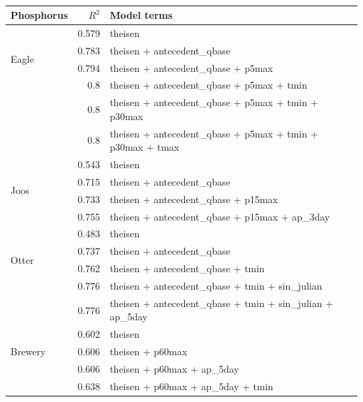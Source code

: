 \documentclass[12pt]{article}
\begin{document}
\begin{table}[h]
\begin{center}
\begin{tabular}{lrl}
    \textbf{Phosphorus} & $R^2$ & Model terms \\
    \hline
    \multirow{4}{*}{Eagle} & 0.579 & theisen\\
    & 0.783 & theisen + antecedent\_qbase\\
    & 0.794 & theisen + antecedent\_qbase + p5max\\
    & 0.8 & theisen + antecedent\_qbase + p5max + tmin \\
    & 0.8 & theisen + antecedent\_qbase + p5max + tmin + p30max\\
    & 0.8 & theisen + antecedent\_qbase + p5max + tmin + p30max + tmax
    \vspace{2mm}\\
    \multirow{4}{*}{Joos} & 0.543 & theisen\\
    & 0.715 & theisen + antecedent\_qbase\\
    & 0.733 & theisen + antecedent\_qbase + p15max\\
    & 0.755 & theisen + antecedent\_qbase + p15max + ap\_3day
    \vspace{2mm}\\
    \multirow{4}{*}{Otter} & 0.483 & theisen\\
    & 0.737 & theisen + antecedent\_qbase\\
    & 0.762 & theisen + antecedent\_qbase + tmin\\
    & 0.776 & theisen + antecedent\_qbase + tmin + sin\_julian\\
    & 0.776 & theisen + antecedent\_qbase + tmin + sin\_julian + ap\_5day
    \vspace{2mm}\\
    \multirow{3}{*}{Brewery} & 0.602 & theisen\\
    & 0.606 & theisen + p60max\\
    & 0.606 & theisen + p60max + ap\_5day\\
    & 0.638 & theisen + p60max + ap\_5day + tmin\\

    \end{tabular}
    \caption{\label{r_square_nosnow}}
    \end{center}
\end{table}
\end{document}
